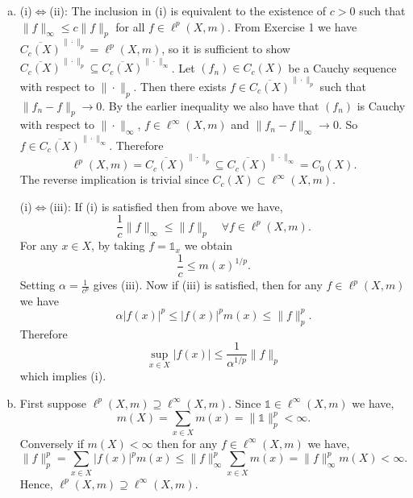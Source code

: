 \begin{enumerate}[(a)]
	\item 
		(i)$\iff$(ii): The inclusion in (i) is equivalent to the existence of $c>0$ such that $\|f\|_{\infty}\leq c\|f\|_{p}$ for all $f\in\ell^{p}(X,m)$. From Exercise 1 we have $\overline{C_{c}(X)}^{\|\cdot\|_{p}}=\ell^{p}(X,m)$, so it is sufficient to show $\overline{C_{c}(X)}^{\|\cdot\|_{p}}\subseteq \overline{C_{c}(X)}^{\|\cdot\|_{\infty}}$. Let $(f_{n})\in C_{c}(X)$ be a Cauchy sequence with respect to $\|\cdot\|_{p}$. Then there exists $f\in\overline{C_{c}(X)}^{\|\cdot\|_{p}}$ such that $\|f_{n}-f\|_{p}\to 0$. By the earlier inequality we also have that $(f_{n})$ is Cauchy with respect to $\|\cdot\|_{\infty}$, $f\in\ell^{\infty}(X,m)$ and $\|f_{n}-f\|_{\infty}\to 0$. So $f\in\overline{C_{c}(X)}^{\|\cdot\|_{\infty}}$. Therefore
		\begin{equation*}
			\ell^p(X,m)=\overline{C_{c}(X)}^{\|\cdot\|_{p}}\subseteq\overline{C_{c}(X)}^{\|\cdot\|_{\infty}}=C_0(X).
		\end{equation*}
		The reverse implication is trivial since $C_{c}(X)\subset\ell^{\infty}(X,m)$.

		(i)$\iff$(iii): If (i) is satisfied then from above we have,
		\begin{equation*}
			\frac{1}{c}\|f\|_{\infty}\leq \|f\|_{p} \quad \forall f\in\ell^{p}(X,m).
		\end{equation*}
		For any $x\in X$, by taking $f=\mathds{1}_{x}$ we obtain
		\begin{equation*}
			\frac{1}{c}\leq m(x)^{1/p}.
		\end{equation*}
		Setting $\alpha=\frac{1}{c^p}$ gives (iii). Now if (iii) is satisfied, then for any $f\in\ell^{p}(X,m)$ we have
		\begin{equation*}
			\alpha |f(x)|^p \leq |f(x)|^p m(x) \leq \|f\|^p_{p}.
		\end{equation*}
		Therefore
		\begin{equation*}
			\sup_{x\in X}|f(x)| \le \frac{1}{\alpha^{1/p}}\|f\|_p
		\end{equation*}
		which implies (i).
	\item 
		First suppose $\ell^{p}(X,m)\supseteq\ell^{\infty}(X,m)$. Since $\mathds{1}\in\ell^{\infty}(X,m)$ we have,
		\begin{equation*}
			m(X)=\sum_{x\in X}m(x) = \|\mathds{1}\|^p_{p} < \infty.
		\end{equation*}
		Conversely if $m(X)<\infty$ then for any $f\in\ell^{\infty}(X,m)$ we have,
		\begin{equation*}
			\|f\|^p_p = \sum_{x\in X}|f(x)|^p m(x) \leq \|f\|^p_{\infty}\sum_{x\in X}m(x) = \|f\|^p_{\infty}m(X) < \infty.
		\end{equation*}
		Hence, $\ell^{p}(X,m)\supseteq\ell^{\infty}(X,m)$.
\end{enumerate}

